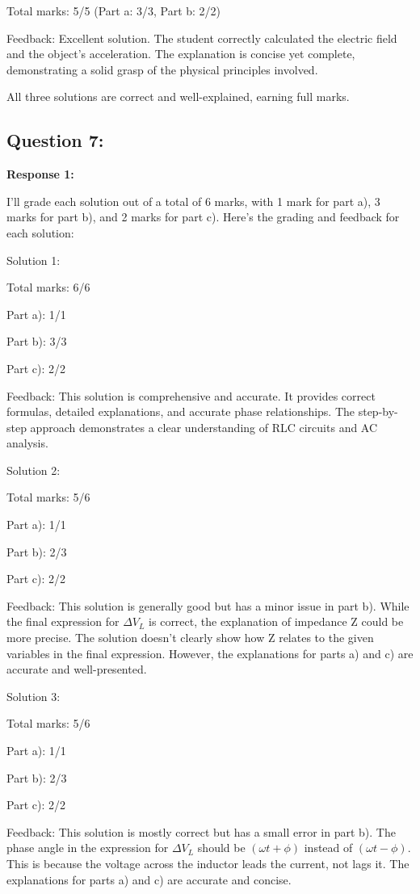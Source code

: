 \documentclass[a4paper,11pt]{article}
\begin{document}
Total marks: 5/5 (Part a: 3/3, Part b: 2/2)

Feedback: Excellent solution. The student correctly calculated the electric field and the object's acceleration. The explanation is concise yet complete, demonstrating a solid grasp of the physical principles involved.

All three solutions are correct and well-explained, earning full marks.


\subsection*{Question 7:}

\textbf{Response 1:}

I'll grade each solution out of a total of 6 marks, with 1 mark for part a), 3 marks for part b), and 2 marks for part c). Here's the grading and feedback for each solution:

Solution 1:

Total marks: 6/6

Part a): 1/1

Part b): 3/3

Part c): 2/2

Feedback: This solution is comprehensive and accurate. It provides correct formulas, detailed explanations, and accurate phase relationships. The step-by-step approach demonstrates a clear understanding of RLC circuits and AC analysis.

Solution 2:

Total marks: 5/6

Part a): 1/1

Part b): 2/3

Part c): 2/2

Feedback: This solution is generally good but has a minor issue in part b). While the final expression for \(\Delta V_L \) is correct, the explanation of impedance Z could be more precise. The solution doesn't clearly show how Z relates to the given variables in the final expression. However, the explanations for parts a) and c) are accurate and well-presented.

Solution 3:

Total marks: 5/6

Part a): 1/1

Part b): 2/3

Part c): 2/2

Feedback: This solution is mostly correct but has a small error in part b). The phase angle in the expression for \(\Delta V_L \) should be \((\omega t + \phi)\) instead of \((\omega t - \phi)\). This is because the voltage across the inductor leads the current, not lags it. The explanations for parts a) and c) are accurate and concise.
\end{document}
